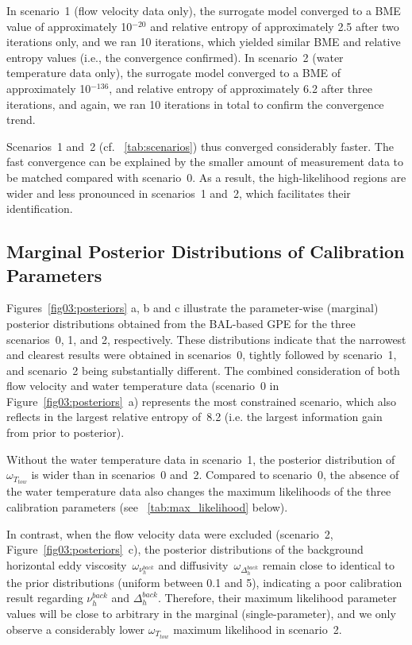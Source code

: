\documentclass[draft,linenumbers,onecolumn]{agujournal2019} %
\begin{document}
In scenario~1 (flow velocity data only), the surrogate model converged to a BME value of approximately 10$^{-20}$ and relative entropy of approximately 2.5 after two iterations only, and we ran 10 iterations, which yielded similar BME and relative entropy values (i.e., the convergence confirmed). In scenario~2 (water temperature data only), the surrogate model converged to a BME of approximately 10$^{-136}$, and relative entropy of approximately 6.2 after three iterations, and again, we ran 10 iterations in total to confirm the convergence trend.

Scenarios~1 and~2 (cf. \tablename{~\ref{tab:scenarios}}) thus converged considerably faster. The fast convergence can be explained by the smaller amount of measurement data to be matched compared with scenario~0. As a result, the high-likelihood regions are wider and less pronounced in scenarios~1 and~2, which facilitates their identification.

\subsection{Marginal Posterior Distributions of Calibration Parameters}

Figures~\ref{fig03:posteriors} a, b and c illustrate the parameter-wise (marginal) posterior distributions obtained from the BAL-based GPE for the three scenarios~0, 1, and 2, respectively. These distributions indicate that the narrowest and clearest results were obtained in scenarios~0, tightly followed by scenario~1, and scenario~2 being substantially different. The combined consideration of both flow velocity and water temperature data (scenario~0 in Figure~\ref{fig03:posteriors}~a) represents the most constrained scenario, which also reflects in the largest relative entropy of~8.2 (i.e. the largest information gain from prior to posterior).

Without the water temperature data in scenario~1, the posterior distribution of \(\omega_{T_{tow}}\) is wider than in scenarios~0 and~2. Compared to scenario~0, the absence of the water temperature data also changes the maximum likelihoods of the three calibration parameters (see \tablename{~\ref{tab:max_likelihood}} below). 

In contrast, when the flow velocity data were excluded (scenario~2, Figure~\ref{fig03:posteriors}~c), the posterior distributions of the background horizontal eddy viscosity~\(\omega_{\nu_{h}^{back}}\) and diffusivity~\(\omega_{\Delta_{h}^{back}}\) remain close to identical to the prior distributions (uniform between 0.1 and 5), indicating a poor calibration result regarding $\nu_{h}^{back}$ and $\Delta_{h}^{back}$. Therefore, their maximum likelihood parameter values will be close to arbitrary in the marginal (single-parameter), and we only observe a considerably lower \(\omega_{T_{tow}}\) maximum likelihood in scenario~2.
\end{document}
